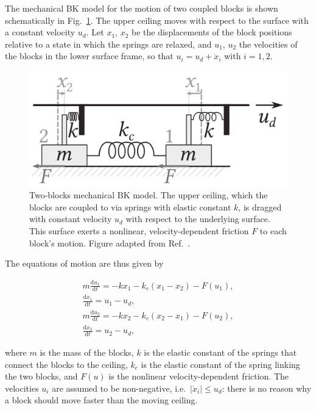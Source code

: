 The mechanical BK model for the motion of two coupled blocks is shown schematically in
Fig.~\ref{fig: 2 blocks motion}. The upper ceiling moves with respect to the surface with
a constant velocity $u_d$. Let $x_1$, $x_2$ be the displacements of the block positions
relative to a state in which the springs are relaxed, and $u_1$, $u_2$ the velocities of the blocks in the
lower surface frame, so that $u_i=u_d+\dot{x}_i$ with $i=1,2$.

\begin{figure}[!htbp]
    \centering
    \includegraphics[width=0.5\linewidth]{images/bk_2_blocks.png}
    \caption{Two-blocks mechanical BK model. The upper ceiling, which the blocks
    are coupled to via springs with elastic constant $k$, is dragged with constant
    velocity $u_d$ with respect to the underlying surface. This surface exerts a nonlinear,
    velocity-dependent friction $F$ to each block's motion. Figure adapted from Ref.~\cite{ref:electronic_analog}.
    }\label{fig: 2 blocks motion}
\end{figure}

The equations of motion are thus given by

\begin{equation}
\label{eq: 2 block motion}
\begin{gathered}
    m\frac{\text{d}u_1}{\text{d}t} = -kx_1 - k_c(x_1-x_2) - F(u_1),\\[10pt]
    \frac{\text{d}x_1}{\text{d}t} = u_1 - u_d,\\[10pt]
    m\frac{\text{d}u_2}{\text{d}t} = -kx_2 - k_c(x_2-x_1) - F(u_2),\\[10pt]
    \frac{\text{d}x_2}{\text{d}t} = u_2 - u_d,
\end{gathered}
\end{equation}

where $m$ is the mass of the blocks, $k$ is the elastic constant of the springs that connect the blocks
to the ceiling, $k_c$ is the elastic constant of the spring linking the two blocks, and $F(u)$ is the nonlinear
velocity-dependent friction.
The velocities $u_i$ are assumed to be non-negative, i.e.\ $|\dot{x}_i|\leq u_d$: there is no reason why
a block should move faster than the moving ceiling.

